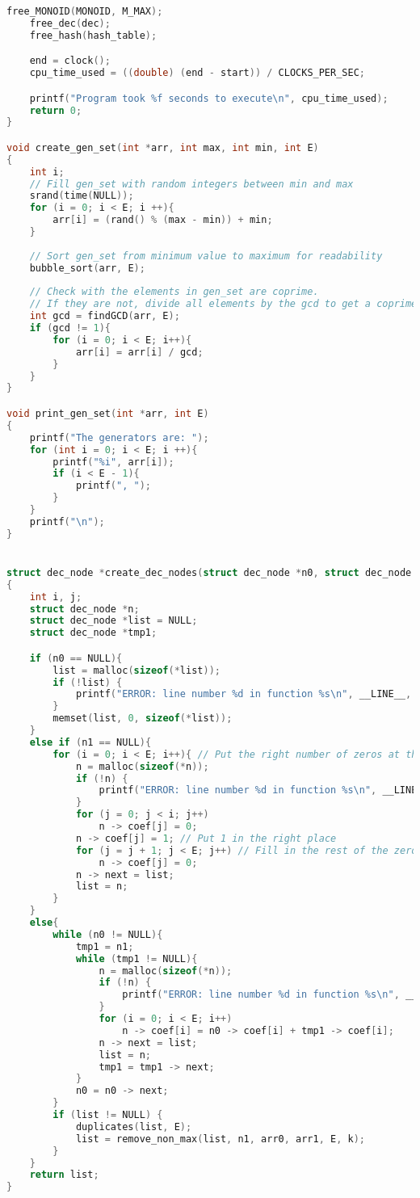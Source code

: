 \begin{lstlisting}[language=C]
    free_MONOID(MONOID, M_MAX);
    free_dec(dec);
    free_hash(hash_table);

    end = clock();
    cpu_time_used = ((double) (end - start)) / CLOCKS_PER_SEC;

    printf("Program took %f seconds to execute\n", cpu_time_used);
    return 0;
}

void create_gen_set(int *arr, int max, int min, int E)
{
    int i;
    // Fill gen_set with random integers between min and max
    srand(time(NULL));
    for (i = 0; i < E; i ++){
        arr[i] = (rand() % (max - min)) + min;
    }
    
    // Sort gen_set from minimum value to maximum for readability
    bubble_sort(arr, E);
    
    // Check with the elements in gen_set are coprime. 
    // If they are not, divide all elements by the gcd to get a coprime list.
    int gcd = findGCD(arr, E);
    if (gcd != 1){
        for (i = 0; i < E; i++){
            arr[i] = arr[i] / gcd;
        }
    }
}

void print_gen_set(int *arr, int E)
{
    printf("The generators are: ");
    for (int i = 0; i < E; i ++){
        printf("%i", arr[i]);
        if (i < E - 1){
            printf(", ");
        }
    }
    printf("\n");
}


struct dec_node *create_dec_nodes(struct dec_node *n0, struct dec_node *n1, int *arr0, struct node **arr1, int E, int k)
{
    int i, j;
    struct dec_node *n;
    struct dec_node *list = NULL;
    struct dec_node *tmp1;

    if (n0 == NULL){
        list = malloc(sizeof(*list));
        if (!list) {
            printf("ERROR: line number %d in function %s\n", __LINE__, __func__);
        }
        memset(list, 0, sizeof(*list));
    }
    else if (n1 == NULL){
        for (i = 0; i < E; i++){ // Put the right number of zeros at the front of the vector
            n = malloc(sizeof(*n));
            if (!n) {
                printf("ERROR: line number %d in function %s\n", __LINE__, __func__);
            }
            for (j = 0; j < i; j++)
                n -> coef[j] = 0;
            n -> coef[j] = 1; // Put 1 in the right place
            for (j = j + 1; j < E; j++) // Fill in the rest of the zeros
                n -> coef[j] = 0;
            n -> next = list;
            list = n;
        }
    }
    else{
        while (n0 != NULL){
            tmp1 = n1;
            while (tmp1 != NULL){
                n = malloc(sizeof(*n));
                if (!n) {
                    printf("ERROR: line number %d in function %s\n", __LINE__, __func__);
                }
                for (i = 0; i < E; i++)
                    n -> coef[i] = n0 -> coef[i] + tmp1 -> coef[i];
                n -> next = list;
                list = n;
                tmp1 = tmp1 -> next;
            }
            n0 = n0 -> next;
        }
        if (list != NULL) {
            duplicates(list, E);
            list = remove_non_max(list, n1, arr0, arr1, E, k);
        }
    }
    return list;
}


\end{lstlisting}
